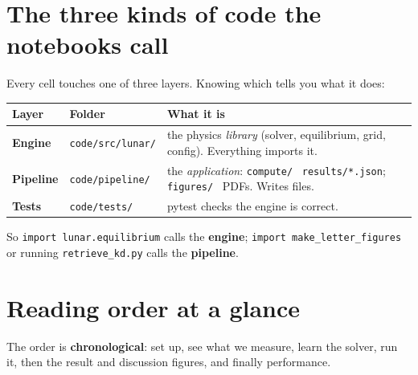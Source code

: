 \documentclass[11pt]{article}
\newcommand{\code}[1]{\texttt{\small #1}}
\newcommand{\arr}{\textrightarrow}
\begin{document}
\section{The three kinds of code the notebooks call}

Every cell touches one of three layers. Knowing which tells you what it does:

\begin{center}\footnotesize
\begin{tabular}{@{}lll@{}}
\toprule
Layer & Folder & What it is \\
\midrule
\textbf{Engine} & \code{code/src/lunar/} & the physics \emph{library} (solver, equilibrium, grid, config). Everything imports it. \\
\textbf{Pipeline} & \code{code/pipeline/} & the \emph{application}: \code{compute/} \arr\ \code{results/*.json}; \code{figures/} \arr\ PDFs. Writes files. \\
\textbf{Tests} & \code{code/tests/} & pytest checks the engine is correct. \\
\bottomrule
\end{tabular}
\end{center}

\noindent
So \code{import lunar.equilibrium} calls the \textbf{engine}; \code{import
make\_letter\_figures} or running \code{retrieve\_kd.py} calls the
\textbf{pipeline}.

\section{Reading order at a glance}

The order is \textbf{chronological}: set up, see what we measure, learn the
solver, run it, then the result and discussion figures, and finally performance.
\end{document}
